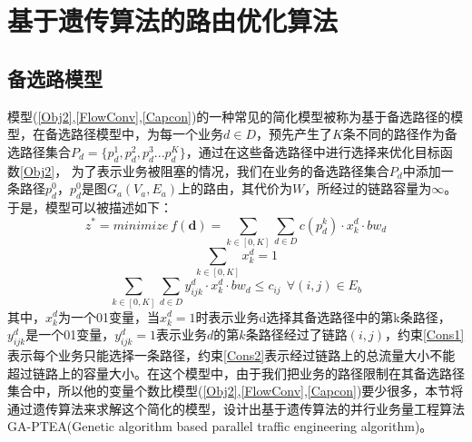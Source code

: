 \section{基于遗传算法的路由优化算法}
\subsection{备选路模型}
模型(\ref{Obj2},\ref{FlowConv},\ref{Capcon})的一种常见的简化模型被称为基于备选路径的模型，在备选路径模型中，为每一个业务$d \in D$，预先产生了$K$条不同的路径作为备选路径集合$P_d=\{p^1_d,p^2_d,p^3_d...p^K_d\}$，通过在这些备选路径中进行选择来优化目标函数\ref{Obj2}，
为了表示业务被阻塞的情况，我们在业务的备选路径集合$P_d$中添加一条路径$p^0_d$，$p_d^0$是图$G_a(V_a,E_a)$上的路由，其代价为$W$，所经过的链路容量为$\infty$。于是，模型可以被描述如下：
\begin{equation}\label{Obj3}
z^* = minimize~f(\mathbf{d})=
\sum\limits_{k \in [0,K]}\sum\limits_{d \in D} c(p_d^k)\cdot x_k^d\cdot bw_d
\end{equation}
\begin{equation}\label{Cons1}
\sum\limits_{k \in [0,K]}x_k^d=1
\end{equation}
\begin{equation}\label{Cons2}
\sum\limits_{k \in [0,K]}\sum\limits_{d \in D} y_{ijk}^d\cdot x_k^d\cdot bw_d\le c_{ij} ~~\forall (i,j)\in E_b
\end{equation}
其中，$x_k^d$为一个01变量，当$x_k^d=1$时表示业务d选择其备选路径中的第k条路径，$y_{ijk}^d$是一个01变量，$y_{ijk}^d=1$表示业务$d$的第$k$条路径经过了链路$(i,j)$，约束\ref{Cons1}表示每个业务只能选择一条路径，约束\ref{Cons2}表示经过链路上的总流量大小不能超过链路上的容量大小。在这个模型中，由于我们把业务的路径限制在其备选路径集合中，所以他的变量个数比模型(\ref{Obj2},\ref{FlowConv},\ref{Capcon})要少很多，本节将通过遗传算法来求解这个简化的模型，设计出基于遗传算法的并行业务量工程算法GA-PTEA(Genetic algorithm based parallel traffic engineering algorithm)。

